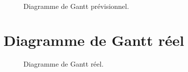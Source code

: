 \documentclass[a4paper]{article}%
\begin{document}
\begin{figure}[h!]
  \begin{center}
  \caption{Diagramme de Gantt prévisionnel.}
  \end{center}
\end{figure}

\clearpage{}
\section{Diagramme de Gantt réel}\label{appendix:realgantt}

\begin{figure}[h!]
  \begin{center}
  \caption{Diagramme de Gantt réel.}
  \end{center}
\end{figure}
\end{document}
